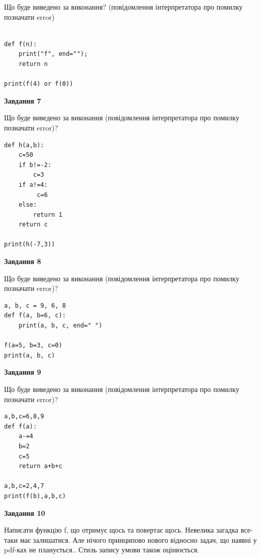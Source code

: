 \documentclass[12pt, ukrainian]{article}
\begin{document}
{\begin {large}
Що буде виведено за виконання? (повідомлення інтерпретатора про помилку позначати error)\par
\begin{verbatim}

def f(n):
    print("f", end="");
    return n

print(f(4) or f(0))
\end{verbatim}

{\begin {center}\textbf{Завдання 7}\end {center}}

Що буде виведено за виконання (повідомлення інтерпретатора про помилку позначати error)?\par
\begin{verbatim}
def h(a,b):
    c=50
    if b!=-2:
        c=3
    if a!=4:
         c=6
    else: 
        return 1
    return c

print(h(-7,3))
\end{verbatim}

{\begin {center}\textbf{Завдання 8}\end {center}}

Що буде виведено за виконання (повідомлення інтерпретатора про помилку позначати error)?\par
\begin{verbatim}
a, b, c = 9, 6, 8
def f(a, b=6, c):
    print(a, b, c, end=" ")

f(a=5, b=3, c=0)
print(a, b, c)
\end{verbatim}

{\begin {center}\textbf{Завдання 9}\end {center}}

Що буде виведено за виконання (повідомлення інтерпретатора про помилку позначати error)?\par
\begin{verbatim}
a,b,c=6,8,9
def f(a):
    a-=4
    b=2
    c=5
    return a+b+c

a,b,c=2,4,7
print(f(b),a,b,c)
\end{verbatim}

{\begin {center}\textbf{Завдання 10}\end {center}}


Написати функцiю f, що отримує щось та повертає щось. Невелика загадка все-таки має залишатися. Але нічого принципово нового відносно задач, що наявні у pdf-ках не планується.. Стиль запису умови також оцінюється.\par
\end {large}}
\newpage
\end{document}
